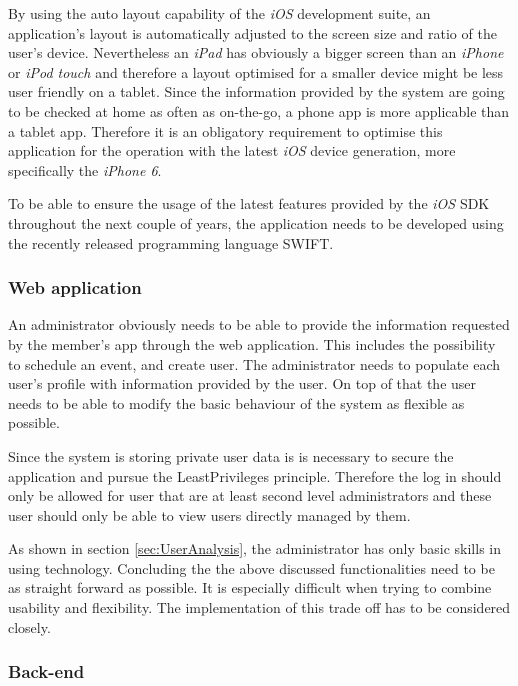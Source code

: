 By using the auto layout capability of the \emph{iOS} development suite, an application's layout is automatically adjusted to the screen size and ratio of the user's device. Nevertheless an \emph{iPad} has obviously a bigger screen than an \emph{iPhone} or \emph{iPod touch} and therefore a layout optimised for a smaller device might be less user friendly on a tablet. Since the information provided by the system are going to be checked at home as often as on-the-go, a phone app is more applicable than a tablet app. Therefore it is an obligatory requirement to optimise this application for the operation with the latest \emph{iOS} device generation, more specifically the \emph{iPhone 6}.

To be able to ensure the usage of the latest features provided by the \emph{iOS} \gls{SDK} throughout the next couple of years, the application needs to be developed using the recently released programming language \gls{SWIFT}.

\subsubsection{Web application}

An administrator obviously needs to be able to provide the information requested by the member's app through the web application. This includes the possibility to schedule an event, and create user. The administrator needs to populate each user's profile with information provided by the user. On top of that the user needs to be able to modify the basic behaviour of the system as flexible as possible.

Since the system is storing private user data is is necessary to secure the application and pursue the \gls{LeastPrivileges} principle. Therefore the log in should only be allowed for user that are at least second level administrators and these user should only be able to view users directly managed by them.

As shown in section \vref{sec:UserAnalysis}, the administrator has only basic skills in using technology. Concluding the the above discussed functionalities need to be as straight forward as possible. It is especially difficult when trying to combine usability and flexibility. The implementation of this trade off has to be considered closely.

\subsubsection{Back-end}

